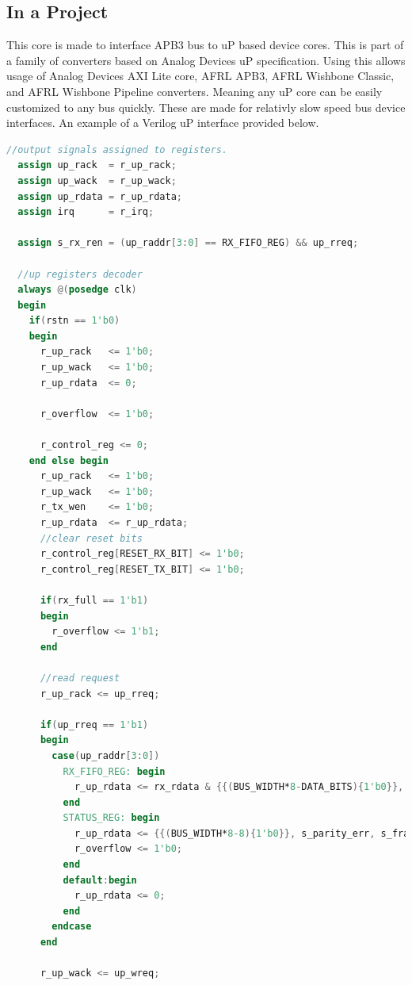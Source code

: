 

\subsection{In a Project}
\par
This core is made to interface APB3 bus to uP based device cores. This is part of a family of converters based on Analog Devices uP specification. Using this allows usage of Analog Devices AXI Lite core, AFRL APB3, AFRL Wishbone Classic, and AFRL Wishbone Pipeline converters. Meaning any uP core can be easily customized to any bus quickly. These are made for relativly slow speed bus device interfaces. An example of a Verilog uP interface provided below.

\begin{lstlisting}[language=Verilog]
  //output signals assigned to registers.
  assign up_rack  = r_up_rack;
  assign up_wack  = r_up_wack;
  assign up_rdata = r_up_rdata;
  assign irq      = r_irq;

  assign s_rx_ren = (up_raddr[3:0] == RX_FIFO_REG) && up_rreq;

  //up registers decoder
  always @(posedge clk)
  begin
    if(rstn == 1'b0)
    begin
      r_up_rack   <= 1'b0;
      r_up_wack   <= 1'b0;
      r_up_rdata  <= 0;

      r_overflow  <= 1'b0;

      r_control_reg <= 0;
    end else begin
      r_up_rack   <= 1'b0;
      r_up_wack   <= 1'b0;
      r_tx_wen    <= 1'b0;
      r_up_rdata  <= r_up_rdata;
      //clear reset bits
      r_control_reg[RESET_RX_BIT] <= 1'b0;
      r_control_reg[RESET_TX_BIT] <= 1'b0;

      if(rx_full == 1'b1)
      begin
        r_overflow <= 1'b1;
      end

      //read request
      r_up_rack <= up_rreq;

      if(up_rreq == 1'b1)
      begin
        case(up_raddr[3:0])
          RX_FIFO_REG: begin
            r_up_rdata <= rx_rdata & {{(BUS_WIDTH*8-DATA_BITS){1'b0}}, {DATA_BITS{1'b1}}};
          end
          STATUS_REG: begin
            r_up_rdata <= {{(BUS_WIDTH*8-8){1'b0}}, s_parity_err, s_frame_err, r_overflow, r_irq_en, tx_full, tx_empty, rx_full, rx_valid};
            r_overflow <= 1'b0;
          end
          default:begin
            r_up_rdata <= 0;
          end
        endcase
      end

      r_up_wack <= up_wreq;


\end{lstlisting}
